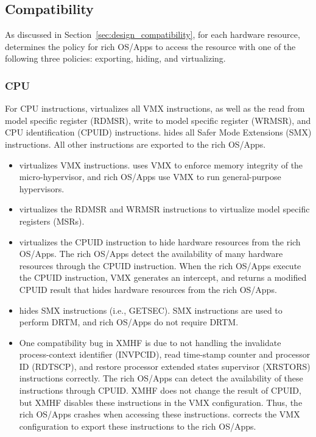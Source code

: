 \subsection{Compatibility}
\label{sec:impl_compatibility}

As discussed in Section~\ref{sec:design_compatibility}, for each hardware resource,  determines the policy for rich OS/Apps to access the resource with one of the following three policies: exporting, hiding, and virtualizing.

\subsubsection{CPU}

For CPU instructions,  virtualizes all VMX instructions, as well as the read from model specific register (RDMSR), write to model specific register (WRMSR), and CPU identification (CPUID) instructions.  hides all Safer Mode Extensions (SMX) instructions. All other instructions are exported to the rich OS/Apps.

\begin{itemize}
\item {} virtualizes VMX instructions.  uses VMX to enforce memory integrity of the micro-hypervisor, and rich OS/Apps use VMX to run general-purpose hypervisors.

\item {} virtualizes the RDMSR and WRMSR instructions to virtualize model specific registers (MSRs).

\item {} virtualizes the CPUID instruction to hide hardware resources from the rich OS/Apps. The rich OS/Apps detect the availability of many hardware resources through the CPUID instruction. When the rich OS/Apps execute the CPUID instruction, VMX generates an intercept, and  returns a modified CPUID result that hides hardware resources from the rich OS/Apps.

\item {} hides SMX instructions (i.e., GETSEC). SMX instructions are used to perform DRTM, and rich OS/Apps do not require DRTM.

\item One compatibility bug in XMHF is due to not handling the invalidate process-context identifier (INVPCID), read time-stamp counter and processor ID (RDTSCP), and restore processor extended states supervisor (XRSTORS) instructions correctly. The rich OS/Apps can detect the availability of these instructions through CPUID. XMHF does not change the result of CPUID, but XMHF disables these instructions in the VMX configuration. Thus, the rich OS/Apps crashes when accessing these instructions.  corrects the VMX configuration to export these instructions to the rich OS/Apps.
\end{itemize}

